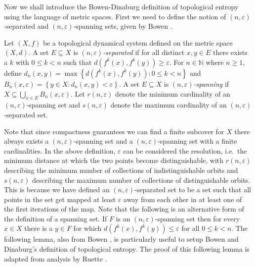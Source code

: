 Now we shall introduce the Bowen-Dinaburg definition of topological entropy using the language of metric spaces. First we need to define the notion of $(n, \varepsilon)$-separated and $(n, \varepsilon)$-spanning sets, given by Bowen \cite{bowen}.

\begin{defn}
    Let $(X, f)$ be a topological dynamical system defined on the metric space $(X, d)$. A set $E \subseteq X$ is \emph{$(n, \varepsilon)$-separated} if for all distinct $x, y \in E$ there exists a $k$ with $0 \leq k < n$ such that $d(f^k(x), f^k(y)) \geq \varepsilon$. For $n \in \mathbb{N}$ where $n \geq 1$, define $d_n(x, y) = \max{\left\lbrace d(f^k(x), f^k(y)) : 0 \leq k < n \right\rbrace}$ and $B_n(x, \varepsilon) = \left\lbrace y \in X : d_n(x, y) < \varepsilon \right\rbrace$. A set $E \subseteq X$ is \emph{$(n, \varepsilon)$-spanning} if $X \subseteq \bigcup_{x \in E}B_n(x, \varepsilon)$. Let $r(n, \varepsilon)$ denote the minimum cardinality of an $(n, \varepsilon)$-spanning set and $s(n, \varepsilon)$ denote the maximum cardinality of an $(n, \varepsilon)$-separated set.
\end{defn}

Note that since compactness guarantees we can find a finite subcover for $X$ there always exists a $(n, \varepsilon)$-spanning set and a $(n, \varepsilon)$-spanning set with a finite cardinalities. In the above definition, $\varepsilon$ can be considered the resolution, i.e.\ the minimum distance at which the two points become distinguishable, with $r(n, \varepsilon)$ describing the minimum number of collections of indistinguishable orbits and $s(n, \varepsilon)$ describing the maximum number of collections of distinguishable orbits. This is because we have defined an $(n, \varepsilon)$-separated set to be a set such that all points in the set get mapped at least $\varepsilon$ away from each other in at least one of the first iterations of the map. Note that the following is an alternative form of the definition of a spanning set. If $F$ is an $(n, \varepsilon)$-spanning set then for every $x \in X$ there is a $y \in F$ for which $d(f^k(x), f^k(y)) \leq \varepsilon$ for all $0 \leq k < n$. The following lemma, also from Bowen \cite{bowen}, is particularly useful to setup Bowen and Dinaburg's definition of topological entropy. The proof of this following lemma is adapted from analysis by Ruette \cite[§4.1]{ruette}.


